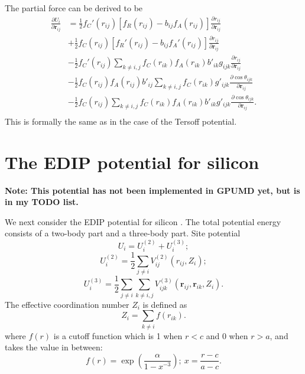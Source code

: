 \documentclass[12pt,a4paper]{report}
\newcommand{\vect}[1]{\boldsymbol{#1}}
\begin{document}
The partial force can be derived to be
\begin{align}
\frac{\partial U_i}{\partial \vect{r}_{ij}}
&= \frac{1}{2}f_C'(r_{ij})[f_R(r_{ij})-b_{ij}f_A(r_{ij})]\frac{\partial r_{ij}}{\partial \vect{r}_{ij}} \nonumber \\
&+ \frac{1}{2}f_C(r_{ij})[f_R'(r_{ij})-b_{ij}f_A'(r_{ij})]\frac{\partial r_{ij}}{\partial \vect{r}_{ij}} \nonumber \\
&- \frac{1}{2}f_C'(r_{ij})\sum_{k\neq i,j}f_C(r_{ik})f_A(r_{ik})b'_{ik}g_{ijk} \frac{\partial r_{ij}}{\partial \vect{r}_{ij}} \nonumber \\
&- \frac{1}{2}f_C(r_{ij})f_A(r_{ij})b'_{ij}\sum_{k\neq i,j}f_C(r_{ik})  g'_{ijk}
   \frac{\partial \cos\theta_{ijk}}{\partial \vect{r}_{ij}} \nonumber \\
&- \frac{1}{2}f_C(r_{ij})\sum_{k\neq i,j}f_C(r_{ik})f_A(r_{ik})b'_{ik}  g'_{ijk}
   \frac{\partial \cos\theta_{ijk}}{\partial \vect{r}_{ij}}. \nonumber \\
\end{align}
This is formally the same as in the case of the Tersoff potential.



\section{The EDIP potential for silicon}


\textbf{Note: This potential has not been implemented in GPUMD yet, but is in my TODO list.}

We next consider the EDIP potential for silicon \cite{bazant1997prb,justo1998prb}. The total potential energy consists of a two-body part and a three-body part. Site potential
\begin{equation}
U_i = U_i^{(2)} + U_i^{(3)};
\end{equation}
\begin{equation}
U_i^{(2)} = \frac{1}{2}\sum_{j\neq i} V^{(2)}_{ij}(r_{ij}, Z_i);
\end{equation}
\begin{equation}
U_i^{(3)} = \frac{1}{2}\sum_{j\neq i}\sum_{k\neq i,j}  V^{(3)}_{ijk} \left(\vect{r}_{ij}, \vect{r}_{ik},  Z_i \right).
\end{equation}
The effective coordination number $Z_i$ is defined as
\begin{equation}
Z_i = \sum_{k\neq i} f(r_{ik}).
\end{equation}
where $f(r)$ is a cutoff function which is 1 when $r<c$ and 0 when $r>a$, and takes the value in between:
\begin{equation}
f(r) = \exp\left( \frac{\alpha}{1-x^{-3}}\right); ~ x = \frac{r-c}{a-c}.
\end{equation}
\end{document}
